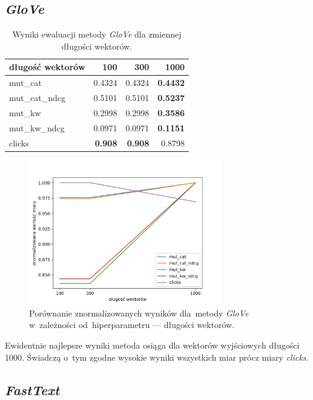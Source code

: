 \documentclass[pl]{minipw} %
\begin{document}
\subsection{\textit{GloVe}}

\begin{table}[H]
	\centering
	\begin{tabular}{lrrr}
		\hline
		długość wektorów &      100 &      300 &     1000 \\
		\hline
		mut\_cat      & 0.4324 & 0.4324 & \textbf{0.4432} \\
		mut\_cat\_ndcg & 0.5101 & 0.5101 & \textbf{0.5237} \\
		mut\_kw       & 0.2998 & 0.2998 &\textbf{ 0.3586} \\
		mut\_kw\_ndcg  & 0.0971 & 0.0971 & \textbf{0.1151} \\
		clicks       & \textbf{0.908}  & \textbf{0.908}  & 0.8798 \\
		\hline
	\end{tabular}
	\caption{Wyniki ewaluacji metody \textit{GloVe} dla zmiennej długości wektorów.}
\end{table}

\begin{figure}[H]
	\centering
	\includegraphics[width=0.75\textwidth]{img/results/gv_ctr.png}
	\caption{Porównanie znormalizowanych wyników dla~metody \textit{GloVe} w~zależności od~hiperparametru --- długości wektorów.}
\end{figure}

Ewidentnie najlepsze wyniki metoda osiąga dla wektorów wyjściowych długości 1000. Świadczą o~tym zgodne wysokie wyniki wszystkich miar prócz miary \textit{clicks}.

\subsection{\textit{FastText}}
\end{document}
